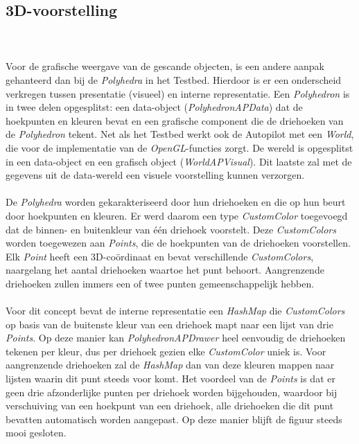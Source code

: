 \subsection{3D-voorstelling}
\\\\
Voor de grafische weergave van de gescande objecten, is een andere aanpak gehanteerd dan bij de \textit{Polyhedra} in het Testbed. Hierdoor is er een onderscheid verkregen tussen presentatie (visueel) en interne representatie. 
Een \textit{Polyhedron} is in twee delen opgesplitst: een data-object (\textit{PolyhedronAPData}) dat de hoekpunten en kleuren bevat en een grafische component die de driehoeken van de \textit{Polyhedron} tekent. Net als het Testbed werkt ook de Autopilot met een \textit{World}, die voor de implementatie van de \textit{OpenGL}-functies zorgt. De wereld is opgesplitst in een data-object en een grafisch object (\textit{WorldAPVisual}). Dit laatste zal met de gegevens uit de data-wereld een visuele voorstelling kunnen verzorgen.\\
\\
\noindent
De \textit{Polyhedra} worden gekarakteriseerd door hun driehoeken en die op hun beurt door hoekpunten en kleuren. Er werd daarom een type \textit{CustomColor} toegevoegd dat de binnen- en buitenkleur van \'e\'en driehoek voorstelt. Deze \textit{CustomColors} worden toegewezen aan \textit{Points}, die de hoekpunten van de driehoeken voorstellen. Elk \textit{Point} heeft een 3D-co\"ordinaat en bevat verschillende \textit{CustomColors}, naargelang het aantal driehoeken waartoe het punt behoort. Aangrenzende driehoeken zullen immers een of twee punten gemeenschappelijk hebben. \\
\\
\noindent
Voor dit concept bevat de interne representatie een \textit{HashMap} die \textit{CustomColors} op basis van de buitenste kleur van een driehoek mapt naar een lijst van drie \textit{Points}. Op deze manier kan \textit{PolyhedronAPDrawer} heel eenvoudig de driehoeken tekenen per kleur, dus per driehoek gezien elke \textit{CustomColor} uniek is. Voor aangrenzende driehoeken zal de \textit{HashMap} dan van deze kleuren mappen naar lijsten waarin dit punt steeds voor komt.
\noindent
Het voordeel van de \textit{Points} is dat er geen drie afzonderlijke punten per driehoek worden bijgehouden, waardoor bij verschuiving van een hoekpunt van een driehoek, alle driehoeken die dit punt bevatten automatisch worden aangepast. Op deze manier blijft de figuur steeds mooi gesloten.